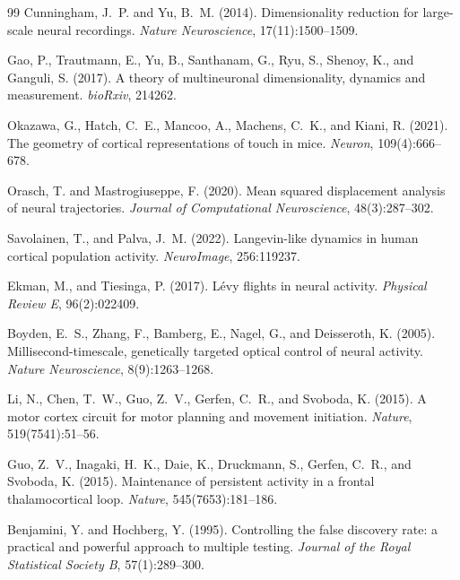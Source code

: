 \documentclass[10pt,onecolumn]{article}
\begin{document}
\begin{thebibliography}{99}
Cunningham, J.~P. and Yu, B.~M. (2014).
\newblock Dimensionality reduction for large-scale neural recordings.
\newblock \textit{Nature Neuroscience}, 17(11):1500--1509.

Gao, P., Trautmann, E., Yu, B., Santhanam, G., Ryu, S., Shenoy, K., and Ganguli, S. (2017).
\newblock A theory of multineuronal dimensionality, dynamics and measurement.
\newblock \textit{bioRxiv}, 214262.

Okazawa, G., Hatch, C.~E., Mancoo, A., Machens, C.~K., and Kiani, R. (2021).
\newblock The geometry of cortical representations of touch in mice.
\newblock \textit{Neuron}, 109(4):666--678.

Orasch, T. and Mastrogiuseppe, F. (2020).
\newblock Mean squared displacement analysis of neural trajectories.
\newblock \textit{Journal of Computational Neuroscience}, 48(3):287--302.

Savolainen, T., and Palva, J.~M. (2022).
\newblock Langevin-like dynamics in human cortical population activity.
\newblock \textit{NeuroImage}, 256:119237.

Ekman, M., and Tiesinga, P. (2017).
\newblock Lévy flights in neural activity.
\newblock \textit{Physical Review E}, 96(2):022409.

Boyden, E.~S., Zhang, F., Bamberg, E., Nagel, G., and Deisseroth, K. (2005).
\newblock Millisecond-timescale, genetically targeted optical control of neural activity.
\newblock \textit{Nature Neuroscience}, 8(9):1263--1268.

Li, N., Chen, T.~W., Guo, Z.~V., Gerfen, C.~R., and Svoboda, K. (2015).
\newblock A motor cortex circuit for motor planning and movement initiation.
\newblock \textit{Nature}, 519(7541):51--56.

Guo, Z.~V., Inagaki, H.~K., Daie, K., Druckmann, S., Gerfen, C.~R., and Svoboda, K. (2015).
\newblock Maintenance of persistent activity in a frontal thalamocortical loop.
\newblock \textit{Nature}, 545(7653):181--186.

Benjamini, Y. and Hochberg, Y. (1995).
\newblock Controlling the false discovery rate: a practical and powerful approach to multiple testing.
\newblock \textit{Journal of the Royal Statistical Society B}, 57(1):289--300.


\end{thebibliography}
\end{document}

